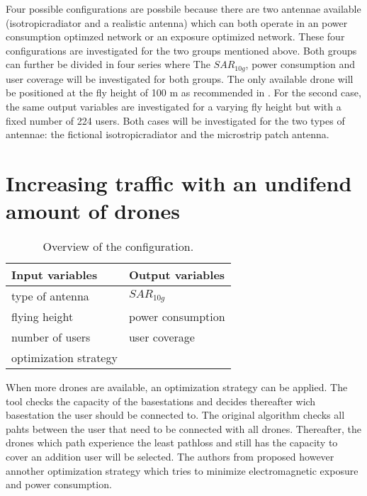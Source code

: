 Four possible configurations are possbile because there are two antennae available (\gls{isotropicradiator} and a realistic antenna) which can both operate in an power consumption optimzed network or an exposure optimized 
network. These four configurations are investigated for the two groups mentioned above.
Both groups can further be divided in four series where 
The $SAR_{10g}$, power consumption and user coverage will be investigated for both groups.
The only available drone will be positioned at the fly height of 100 m as recommended in \cite{J2}. For the second case, the same output variables are investigated 
for a varying fly height but with a fixed number of 224 users.
Both cases will be investigated for the two types of antennae: the fictional \gls{isotropicradiator} and the microstrip patch antenna.




\section{Increasing traffic with an undifend amount of drones}
\begin{table}[!htb]
      \centering
            \begin{tabular}{|l|l|}
            \hline
            \textbf{Input variables  }              & \textbf{Output variables}          \\   \hline 
            type of antenna                & $SAR_{10g}$               \\ 
            flying height                   & power consumption             \\ 
            number of users                & user coverage            \\ 
            optimization strategy           & \\
            \hline
            \end{tabular}
        \caption{Overview of the configuration.}
        \label{table:confOverviewScenario2}
\end{table}


When more drones are available, an optimization strategy can be applied. The tool checks the capacity of the basestations and decides thereafter
wich basestation the user should be connected to. The original algorithm checks all pahts between the user that need to be connected with 
all drones. Thereafter, the drones which path experience the least pathloss and still has the capacity to cover an addition user will be selected.
The authors from \cite{J1} proposed however annother optimization strategy which tries to minimize electromagnetic exposure and 
power consumption.

